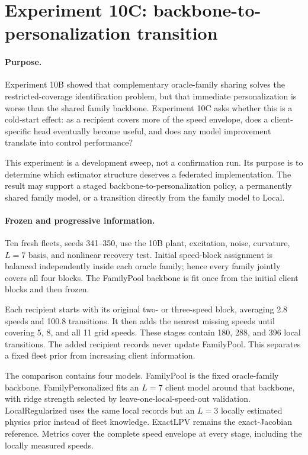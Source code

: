 \section{Experiment 10C: backbone-to-personalization transition}
\label{sec:experiment10c}

\paragraph{Purpose.}
Experiment 10B showed that complementary oracle-family sharing solves the
restricted-coverage identification problem, but that immediate personalization
is worse than the shared family backbone. Experiment 10C asks whether this is a
cold-start effect: as a recipient covers more of the speed envelope, does a
client-specific head eventually become useful, and does any model improvement
translate into control performance?

This experiment is a development sweep, not a confirmation run. Its purpose is
to determine which estimator structure deserves a federated implementation.
The result may support a staged backbone-to-personalization policy, a permanently
shared family model, or a transition directly from the family model to Local.

\paragraph{Frozen and progressive information.}
Ten fresh fleets, seeds 341--350, use the 10B plant, excitation, noise,
curvature, $L=7$ basis, and nonlinear recovery test. Initial speed-block
assignment is balanced independently inside each oracle family; hence every
family jointly covers all four blocks. The FamilyPool backbone is fit once from
the initial client blocks and then frozen.

Each recipient starts with its original two- or three-speed block, averaging
2.8 speeds and 100.8 transitions. It then adds the nearest missing speeds until
covering 5, 8, and all 11 grid speeds. These stages contain 180, 288, and 396
local transitions. The added recipient records never update FamilyPool. This
separates a fixed fleet prior from increasing client information.

The comparison contains four models. FamilyPool is the fixed oracle-family
backbone. FamilyPersonalized fits an $L=7$ client model around that backbone,
with ridge strength selected by leave-one-local-speed-out validation.
LocalRegularized uses the same local records but an $L=3$ locally estimated
physics prior instead of fleet knowledge. ExactLPV remains the exact-Jacobian
reference. Metrics cover the complete speed envelope at every stage, including
the locally measured speeds.

